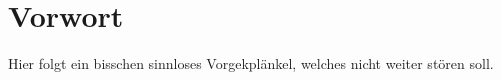 \chapter{Vorwort}
Hier folgt ein bisschen sinnloses Vorgekplänkel, welches nicht weiter stören soll.

